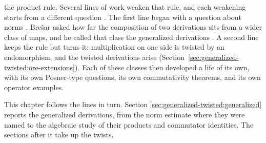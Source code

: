 the product rule. Several lines of work weaken that rule, and each weakening
starts from a different question \cite[p.~89]{Bresar1991Glasgow}. The first
line began with a question about norms \cite[p.~89]{Bresar1991Glasgow}. Brešar asked how far the composition
of two derivations sits from a wider class of maps, and he called that class
the generalized derivations \cite[p.~89]{Bresar1991Glasgow}. A second line
keeps the rule but turns it: multiplication on one side is twisted by an
endomorphism, and the twisted derivations arise
(Section~\ref{sec:generalized-twisted:ore-extensions}). Each of these classes then
developed a life of its own, with its own Posner-type questions, its own
commutativity theorems, and its own operator examples.

This chapter follows the lines in turn.
Section
\ref{sec:generalized-twisted:generalized} reports the generalized derivations,
from the norm estimate where they were named to the algebraic study of their
products and commutator identities. The sections after it take up the twists.
